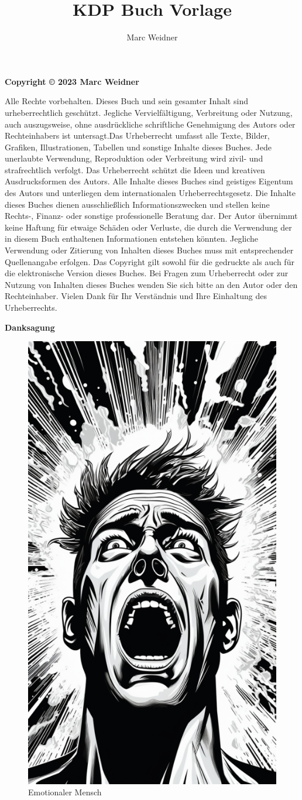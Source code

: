 \documentclass[12pt,oneside,openright]{book}
\title{KDP Buch Vorlage\\}
\author{Marc Weidner}
\begin{document}
	\maketitle
	\newpage
	\tableofcontents
	\newpage
	\begin{center}
		\textbf{Copyright © 2023 Marc Weidner}
	\end{center}
		\begin{flushleft}
		Alle Rechte vorbehalten. Dieses Buch und sein gesamter Inhalt sind urheberrechtlich geschützt. Jegliche Vervielfältigung, Verbreitung oder Nutzung, auch auszugsweise, ohne ausdrückliche schriftliche Genehmigung des Autors oder Rechteinhabers ist untersagt.Das Urheberrecht umfasst alle Texte, Bilder, Grafiken, Illustrationen, Tabellen und sonstige Inhalte dieses Buches. Jede unerlaubte Verwendung, Reproduktion oder Verbreitung wird zivil- und strafrechtlich verfolgt. Das Urheberrecht schützt die Ideen und kreativen Ausdrucksformen des Autors. Alle Inhalte dieses Buches sind geistiges Eigentum des Autors und unterliegen dem internationalen Urheberrechtsgesetz.
	\newline
		Die Inhalte dieses Buches dienen ausschließlich Informationszwecken und stellen keine Rechts-, Finanz- oder sonstige professionelle Beratung dar. Der Autor übernimmt keine Haftung für etwaige Schäden oder Verluste, die durch die Verwendung der in diesem Buch enthaltenen Informationen entstehen könnten. Jegliche Verwendung oder Zitierung von Inhalten dieses Buches muss mit entsprechender Quellenangabe erfolgen.
	\newline
		Das Copyright gilt sowohl für die gedruckte als auch für die elektronische Version dieses Buches. Bei Fragen zum Urheberrecht oder zur Nutzung von Inhalten dieses Buches wenden Sie sich bitte an den Autor oder den Rechteinhaber.
	\newline
		Vielen Dank für Ihr Verständnis und Ihre Einhaltung des Urheberrechts.
	\end{flushleft}
	\newpage
	\begin{center}
		\textbf{Danksagung}
	\end{center}
	\lipsum[1-5]
	\begin{figure}[h]
		\centering
		\includegraphics[frame,width=0.5\linewidth]{pics/01}
		\caption[Emotionaler Mensch]{Emotionaler Mensch}
		\label{Emotionaler Mensch}
	\end{figure}
	\newpage
	
\end{document}
